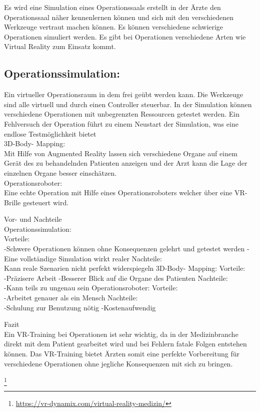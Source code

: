 
Es wird eine Simulation eines Operationssaals erstellt in der Ärzte den Operationssaal näher kennenlernen können und sich mit den verschiedenen Werkzeuge vertraut machen können. Es können verschiedene schwierige Operationen simuliert werden. Es gibt bei Operationen verschiedene Arten wie Virtual Reality zum Einsatz kommt.\\
\subsection{Operationssimulation:}
Ein virtueller Operationsraum in dem frei geübt werden kann. Die Werkzeuge sind alle virtuell und durch einen Controller steuerbar. In der Simulation können verschiedene Operationen mit unbegrenzten Ressourcen getestet werden. Ein Fehlversuch der Operation führt zu einem Neustart der Simulation, was eine endlose Testmöglichkeit bietet\\
3D-Body- Mapping:\\
Mit Hilfe von Augmented Reality lassen sich verschiedene Organe auf einem Gerät des zu behandelnden Patienten anzeigen und der Arzt kann die Lage der einzelnen Organe besser einschätzen. \cite{mehlitz1998virtual} \\
Operationsroboter:\\
Eine echte Operation mit Hilfe eines Operationsroboters welcher über eine VR-Brille gesteuert wird.

Vor- und Nachteile\\
Operationssimulation:\\
Vorteile:\\
-Schwere Operationen
können ohne Konsequenzen gelehrt und getestet werden
-Eine vollständige Simulation wirkt realer
Nachteile:\\
Kann reale Szenarien nicht perfekt widerspiegeln
3D-Body- Mapping:
Vorteile:\\
-Präzisere Arbeit
-Besserer Blick auf die Organe des Patienten
Nachteile:\\
-Kann teils zu ungenau sein
Operationsroboter:
Vorteile:\\
-Arbeitet genauer als ein Mensch
Nachteile:\\
-Schulung zur Benutzung nötig
-Kostenaufwendig

Fazit\\
Ein VR-Training bei Operationen ist sehr wichtig, da in der Medizinbranche direkt mit dem Patient gearbeitet wird und bei Fehlern fatale Folgen entstehen können. Das VR-Training bietet Ärzten somit eine perfekte Vorbereitung für verschiedene Operationen ohne jegliche Konsequenzen mit sich zu bringen.


\footnote{\url{https://vr-dynamix.com/virtual-reality-medizin/}}

